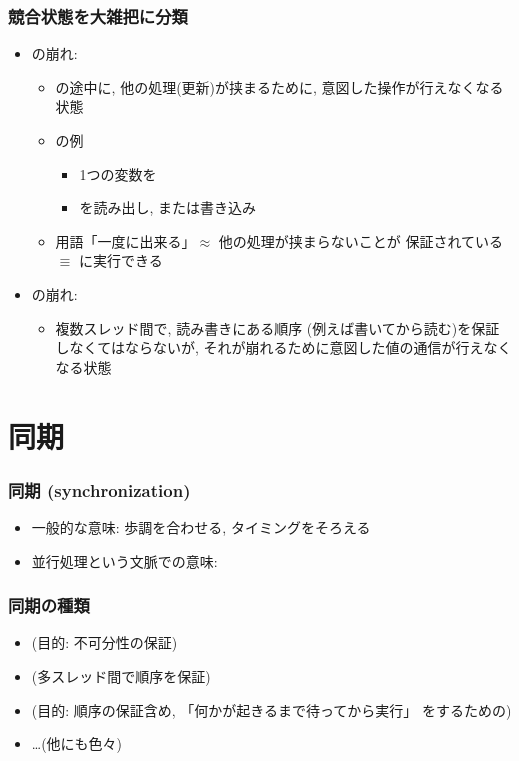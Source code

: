 \documentclass[12pt,dvipdfmx]{beamer}
\begin{document}
\begin{frame}
  \frametitle{競合状態を大雑把に分類}
  \begin{itemize}
  \item {}の崩れ:
    \begin{itemize}
    \item {}の途中に,
      他の処理(更新)が挟まるために, 意図した操作が行えなくなる状態
    \item {}の例
      \begin{itemize}
      \item 1つの変数を
      \item {}を読み出し, または書き込み
      \end{itemize}
    \item 用語「一度に出来る」$\approx$ 他の処理が挟まらないことが
      保証されている $\equiv$ に実行できる
    \end{itemize}
    
  \item {}の崩れ:
    \begin{itemize}
    \item 複数スレッド間で, 読み書きにある順序
      (例えば書いてから読む)を保証しなくてはならないが,
      それが崩れるために意図した値の通信が行えなくなる状態
    \end{itemize}    
  \end{itemize}
\end{frame}

\section{同期}
\begin{frame}
  \frametitle{同期 (synchronization)}
  \begin{itemize}
  \item 一般的な意味: 歩調を合わせる, タイミングをそろえる
  \item 並行処理という文脈での意味:
  \end{itemize}
\end{frame}

\begin{frame}
  \frametitle{同期の種類}
  \begin{itemize}
  \item {} (目的: 不可分性の保証)
  \item {} (多スレッド間で順序を保証)
  \item {} (目的:
    順序の保証含め, 「何かが起きるまで待ってから実行」
    をするための)
  \item \ldots (他にも色々)
  \end{itemize}
\end{frame}
\end{document}
